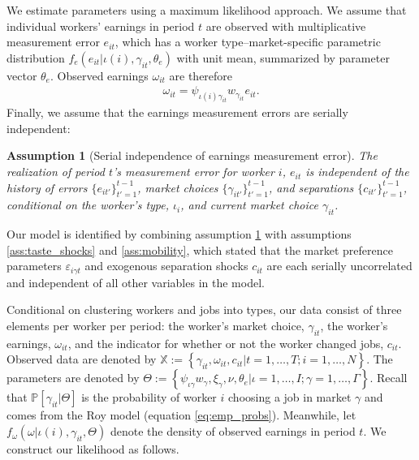 \documentclass[12pt]{article}
\def\ig{\iota\gamma}
\def\g{\gamma}
\def\i{\iota}
\renewcommand{\P}{\mathbb {P}}
\theoremstyle{definition}
\theoremstyle{plain}
\newtheorem{assumption}[theorem]{Assumption}
\def\ve{\varepsilon}
\begin{document}
We estimate parameters using a maximum likelihood approach. We assume that individual workers' earnings in period $t$ are observed with multiplicative measurement error $e_{it}$, which has a worker type--market-specific parametric distribution $f_e(e_{it} | \i(i), \g_{it}, \theta_e)$ with unit mean, summarized by parameter vector $\theta_e$. Observed earnings $\omega_{it}$ are therefore
\begin{align}
	\omega_{it} = \psi_{\i(i)\g_{it}} w_{\g_{it}} e_{it}. \label{eq:observed_wages}
\end{align}
Finally, we assume that the earnings measurement errors are serially independent:
\begin{assumption}[Serial independence of earnings measurement error]
	\label{ass:serial_independence}
	The realization of period $t$'s measurement error for worker $i$, $e_{it}$ is independent of the history of errors $\{e_{it'}\}_{t'=1}^{t-1}$, market choices $\{\g_{it'}\}_{t'=1}^{t-1}$, and separations $\{c_{it'}\}_{t'=1}^{t-1}$, conditional on the worker's type, $\i_i$, and current market choice $\g_{it}$.
\end{assumption}

Our model is identified by combining assumption \ref{ass:serial_independence} with assumptions \ref{ass:taste_shocks} and \ref{ass:mobility}, which stated that the market preference parameters $\ve_{i\g t}$ and exogenous separation shocks $c_{it}$ are each serially uncorrelated and independent of all other variables in the model.


Conditional on clustering workers and jobs into types, our data consist of three elements per worker per period: the worker's market choice, $\gamma_{it}$, the worker's earnings, $\omega_{it}$, and the indicator for whether or not the worker changed jobs, $c_{it}$. Observed data are denoted by $\mathbb{X} := \left\{ \gamma_{it},\omega_{it},c_{i t} | t = 1, \ldots, T; i = 1, \ldots, N \right\}$. The parameters are denoted by $\Theta := \left\{ \psi_{\ig}w_\g, \xi_{\g}, \nu, \theta_e | \i = 1,\ldots, I; \g = 1, \ldots, \Gamma  \right\}$. Recall that $\P[\g_{it}|\Theta]$ is the probability of worker $i$ choosing a job in market $\g$ and comes from the Roy model (equation \ref{eq:emp_probs}). Meanwhile, let $f_{\omega}(\omega| \i(i), \g_{it}, \Theta)$ denote the density of observed earnings in period $t$. We construct our likelihood as follows. 
\end{document}
